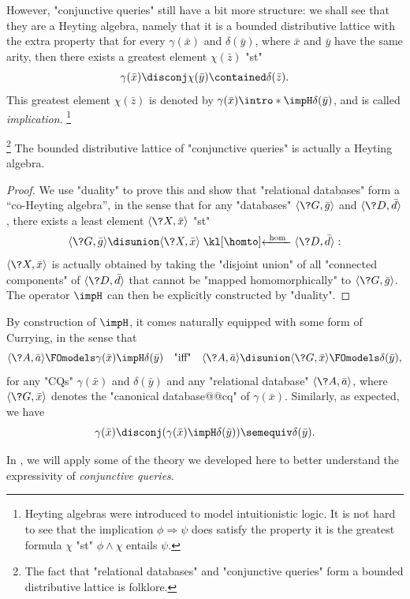 However, "conjunctive queries" still have a bit more structure: we shall
see that they are a Heyting algebra, namely that it is a bounded distributive lattice
with the extra property that for every $\gamma(\bar x)$ and $\delta(\bar y)$,
where $\bar x$ and $\bar y$ have the same arity, then there exists
a greatest element $\chi(\bar z)$ "st"
\[
	\gamma(\bar x) \disconj \chi(\bar y) \contained \delta(\Bar z). 
\]
This greatest element $\chi(\bar z)$ is denoted by \AP$\gamma(\bar x) \intro*\impH \delta(\bar y)$, and is called \emph{implication}.%
\footnote{Heyting algebras were introduced to model intuitionistic logic.
It is not hard to see that the implication $\phi \Rightarrow \psi$
does satisfy the property it is the greatest formula $\chi$
"st" $\phi \land \chi$ entails $\psi$.}

\begin{proposition}
	\!\footnote{The fact that "relational databases" and "conjunctive queries" form
	a bounded distributive lattice is folklore.}
	The bounded distributive lattice of "conjunctive queries" is actually
	a Heyting algebra.
\end{proposition}

\begin{proof}
	We use "duality" to prove this and show that "relational databases" form a ``co-Heyting algebra'',
	in the sense that for any "databases" $\tup{\?G, \bar g}$ and $\tup{\?D, \bar d}$,
	there exists a least element $\tup{\?X, \bar x}$ "st"
	\[
		\tup{\?G, \bar g} \disunion \tup{\?X, \bar x} \cohomto \tup{\?D, \bar d}:
	\]
	$\tup{\?X, \bar x}$ is actually obtained by taking the "disjoint union"
	of all "connected components" of $\tup{\?D, \bar d}$ 
	that cannot be "mapped homomorphically" to $\tup{\?G, \bar g}$.
	The operator $\impH$ can then be explicitly constructed by "duality".
\end{proof}

By construction of $\impH$, it comes naturally equipped with some
form of Currying, in the sense that
\[
	\tup{\?A, \bar a}
	\FOmodels \gamma(\bar x) \impH \delta(\bar y)
	\quad\text{"iff"}\quad
	\tup{\?A, \bar a} \disunion \tup{\?G, \bar x}
	\FOmodels \delta(\bar y),
\]
for any "CQs" $\gamma(\bar x)$ and $\delta(\bar y)$
and any "relational database" $\tup{\?A, \bar a}$,
where $\tup{\?G, \bar x}$ denotes the "canonical database@@cq" of $\gamma(\bar x)$.
Similarly, as expected, we have
\[
	\gamma(\bar x) \disconj (\gamma(\bar x) \impH \delta(\bar y))
	\semequiv
	\delta(\bar y).
\]

In ,
we will apply some of the theory we developed here
to better understand the expressivity of \emph{conjunctive queries}.

